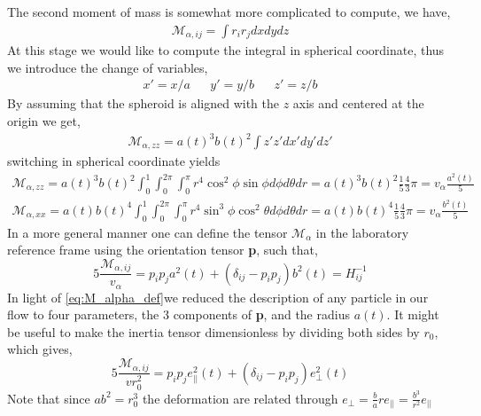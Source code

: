 The second moment of mass is somewhat more complicated to compute, we have, 
\begin{align*}
    \mathcal{M}_{\alpha,ij}
    = \int r_ir_j dxdydz
\end{align*}
At this stage we would like to compute the integral in spherical coordinate, thus we introduce the change of variables, 
\begin{align*}
    x' = x/a 
    && y' = y/b 
    && z' = z/b 
\end{align*}
By assuming that the spheroid is aligned with the $z$ axis and centered at the origin we get, 
\begin{align*}
    \mathcal{M}_{\alpha,zz}
    = a(t)^3 b(t)^2 \int z'z' dx'dy'dz'
\end{align*}
switching in spherical coordinate yields 
\begin{align*}
    \mathcal{M}_{\alpha,zz}
    = a(t)^3 b(t)^2 \int_0^1 \int_0^{2\pi}\int_0^\pi r^4 \cos^2\phi \sin\phi d\phi d\theta dr
    = a(t)^3 b(t)^2 \frac{1}{5}\frac{4}{3} \pi
    = v_\alpha \frac{a^2(t)}{5}\\
    \mathcal{M}_{\alpha,xx}
    = a(t) b(t)^4 \int_0^1 \int_0^{2\pi}\int_0^\pi r^4 \sin^3\phi\cos^2\theta d\phi d\theta dr
    = a(t) b(t)^4
    \frac{1}{5}
     \frac{4}{3}
     \pi
     =v_\alpha \frac{b^2(t)}{5}
\end{align*}
In a more general manner one can define the tensor $\mathcal{M}_\alpha$ in the laboratory reference frame using the orientation tensor \textbf{p}, such that, 
\begin{equation}
    5 \frac{\mathcal{M}_{\alpha,ij}}{v_\alpha}
    = p_i p_j 
    a^2(t) 
    + (\delta_{ij} - p_ip_j) b^2(t)
    = H_{ij}^{-1}
    \label{eq:M_alpha_def}
\end{equation} 
In light of \ref{eq:M_alpha_def}we reduced the description of any particle in our flow to four parameters, the 3 components of \textbf{p}, and the radius $a(t)$. 
It might be useful to make the inertia tensor dimensionless by dividing both sides by $r_0$, which gives, 
\begin{equation}
    5 \frac{\mathcal{M}_{\alpha,ij}}{v r_0^2}
    = p_i p_j 
    e_{||}^2(t) 
    + (\delta_{ij} - p_ip_j) 
    e_\bot^2(t) 
    \label{eq:M_alpha_def2}
\end{equation} 
Note that since $ab^2 =r_0^3$ the deformation are related through $e_\bot = \frac{b}{a}r e_{||} =\frac{b^3}{r^2} e_{||} $


